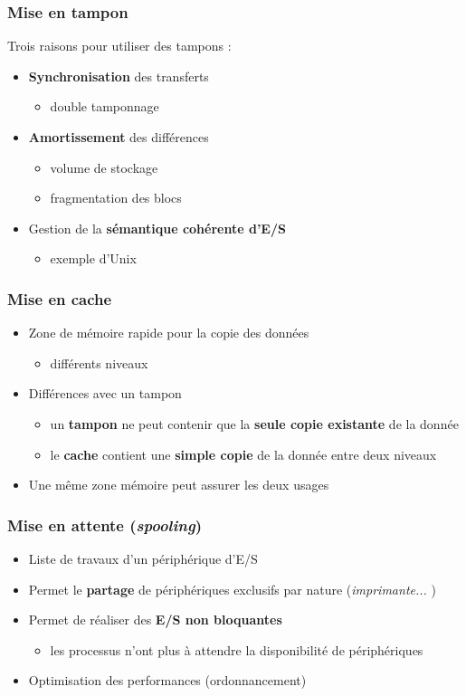 \begin{frame}
\frametitle{Mise en tampon}
Trois raisons pour utiliser des tampons :
\begin{itemize}
\item \textbf{Synchronisation} des transferts
\begin{itemize}
\item double tamponnage
\end{itemize}
\item \textbf{Amortissement} des différences
\begin{itemize}
\item volume de stockage
\item fragmentation des blocs
\end{itemize}
\item Gestion de la \textbf{sémantique cohérente d'E/S}
\begin{itemize}
\item exemple d'Unix
\end{itemize}
\end{itemize}
\end{frame}

\begin{frame}
\frametitle{Mise en cache}
\begin{itemize}
\item Zone de mémoire rapide pour la copie des données
\begin{itemize}
\item différents niveaux
\end{itemize}
\item Différences avec un tampon
\begin{itemize}
\item un \textbf{tampon} ne peut contenir que la \textbf{seule copie existante} de la donnée
\item le \textbf{cache} contient une \textbf{simple copie} de la donnée entre deux niveaux
\end{itemize}
\item Une même zone mémoire peut assurer les deux usages
\end{itemize}
\end{frame}

\begin{frame}
\frametitle{Mise en attente (\textit{spooling})}
\begin{itemize}
\item Liste de travaux d'un périphérique d'E/S
\item Permet le \textbf{partage} de périphériques exclusifs par nature (\textit{imprimante... })
\item Permet de réaliser des \textbf{E/S non bloquantes}
\begin{itemize}
\item les processus n'ont plus à attendre la disponibilité de périphériques
\end{itemize}

\item Optimisation des performances (ordonnancement)
\end{itemize}
\end{frame}

